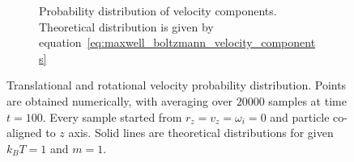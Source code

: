 \begin{figure}[h]
\begin{subfigure}[t]{0.45\textwidth}
		\captionsetup{justification=centering, width=0.9\textwidth}
		\caption{Probability distribution of velocity components. Theoretical distribution is given by equation~\eqref{eq:maxwell_boltzmann_velocity_components}}
	\end{subfigure}
	\captionsetup{justification=centering, width=0.9\textwidth}
	\caption{Translational and rotational velocity probability distribution. Points are obtained numerically, with averaging over $20000$ samples at time $t = 100$. Every sample started from $r_z = v_z = \omega_i = 0$ and particle co-aligned to $z$ axis. Solid lines are theoretical distributions for given $k_BT = 1$ and $m = 1$.}
	\label{fig:velocity_distributions}
\end{figure}